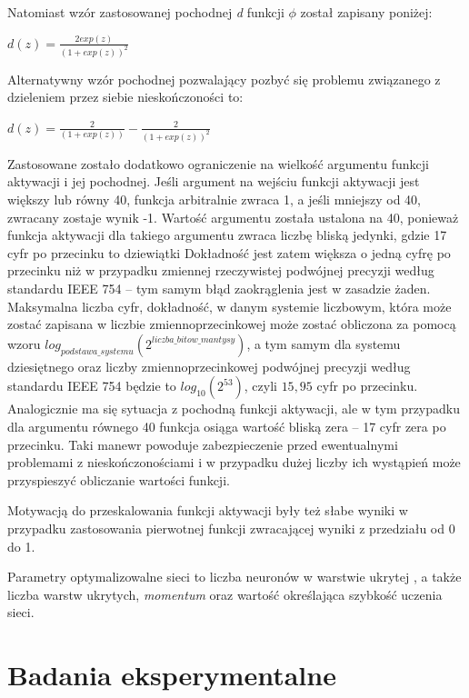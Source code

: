 \documentclass[11pt,a4paper]{llncs}
\begin{document}
Natomiast wzór zastosowanej pochodnej \emph{d} funkcji \( \phi \) został zapisany poniżej:
\begin{center}
\( d(z) = \frac{2exp(z)}{(1 + exp(z))^{2}} \)
\end{center}

Alternatywny wzór pochodnej pozwalający pozbyć się problemu związanego z dzieleniem przez siebie nieskończoności to:
\begin{center}
\( d(z) = \frac{2}{(1 + exp(z))} - \frac{2}{(1 + exp(z))^{2}} \)
\end{center}

Zastosowane zostało dodatkowo ograniczenie na wielkość argumentu funkcji aktywacji i jej pochodnej.
Jeśli argument na wejściu funkcji aktywacji jest większy lub równy 40, funkcja arbitralnie zwraca 1, a jeśli mniejszy od 40, zwracany zostaje wynik -1.
Wartość argumentu została ustalona na 40, ponieważ funkcja aktywacji dla takiego argumentu zwraca liczbę bliską jedynki, gdzie 17 cyfr po przecinku to dziewiątki
Dokładność jest zatem większa o jedną cyfrę po przecinku niż w przypadku zmiennej rzeczywistej podwójnej precyzji według standardu IEEE 754 -- tym samym błąd zaokrąglenia jest w zasadzie żaden.
Maksymalna liczba cyfr, dokładność, w danym systemie liczbowym, która może zostać zapisana w liczbie zmiennoprzecinkowej może zostać obliczona za pomocą wzoru $ log_{podstawa\_systemu}(2^{liczba\_bitow\_mantysy}) $, a tym samym dla systemu dziesiętnego oraz liczby zmiennoprzecinkowej podwójnej precyzji według standardu IEEE 754 będzie to $ log_{10}(2^{53}) $, czyli $ 15,95 $ cyfr po przecinku.
Analogicznie ma się sytuacja z pochodną funkcji aktywacji, ale w tym przypadku dla argumentu równego 40 funkcja osiąga wartość bliską zera -- 17 cyfr zera po przecinku.
Taki manewr powoduje zabezpieczenie przed ewentualnymi problemami z nieskończonościami i w przypadku dużej liczby ich wystąpień może przyspieszyć obliczanie wartości funkcji.

\par
Motywacją do przeskalowania funkcji aktywacji były też słabe wyniki w przypadku zastosowania pierwotnej funkcji zwracającej wyniki z przedziału od 0 do 1.

\par
Parametry optymalizowalne sieci to liczba neuronów w warstwie ukrytej \cite{coling}, a także liczba warstw ukrytych, \emph{momentum} oraz wartość określająca szybkość uczenia sieci.


\section{Badania eksperymentalne}\label{s4}
\end{document}
